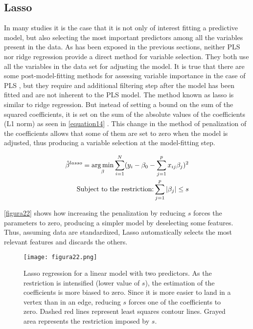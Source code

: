 \subsection{Lasso}
\label{lasso}
In many studies it is the case that it is not only of interest fitting a predictive model, but also selecting the most important predictors among all the variables present in the data. As has been exposed in the previous sections, neither PLS nor ridge regression provide a direct method for variable selection. They both use all the variables in the data set for adjusting the model. It is true that there are some post-model-fitting methods for assessing variable importance in the case of PLS \parencite{mehmood2012review}, but they require and additional filtering step after the model has been fitted and are not inherent to the PLS model. The method known as lasso is similar to ridge regression. But instead of setting a bound on the sum of the squared coefficients, it is set on the sum of the absolute values of the coefficients (L1 norm) as seen in \autoref{equation14} \parencite{tibshirani1996regression}. This change in the method of penalization of the coefficients allows that some of them are set to zero when the model is adjusted, thus producing a variable selection at the model-fitting step.

\begin{equation}
\label{equation14}
\begin{split}
\hat{\beta}^{lasso}=\operatorname*{arg\,min}_\beta \sum\limits_{i=1}^N (y_{i}-\beta_{0}-\sum\limits_{j=1}^p x_{ij}\beta_{j})^{2} \\
\textrm{Subject to the restriction:}  \sum\limits_{j=1}^p |\beta_{j}|\leq s
\end{split}
\end{equation}

\autoref{figura22} shows how increasing the penalization by reducing $s$ forces the parameters to zero, producing a simpler model by deselecting some features. Thus, assuming data are standardized, Lasso automatically selects the most relevant features and discards the others.

\begin{figure}[hbtp]
\centering
\texttt{[image: figura22.png]}
\caption[Lasso regression for a linear model with two predictors]{Lasso regression for a linear model with two predictors. As the restriction is intensified (lower value of $s$), the estimation of the coefficients is more biased to zero. Since it is more easier to land in a vertex than in an edge, reducing $s$ forces one of the coefficients to zero. Dashed red lines represent least squares contour lines. Grayed area represents the restriction imposed by $s$.}
\label{figura22}
\end{figure}

